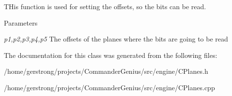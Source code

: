 THis function is used for setting the offsets, so the bits can be read. 


\begin{DoxyParams}{Parameters}
\item[{\em p1,p2,p3,p4,p5}]The offsets of the planes where the bits are going to be read \end{DoxyParams}


The documentation for this class was generated from the following files:\begin{DoxyCompactItemize}
\item 
/home/gerstrong/projects/CommanderGenius/src/engine/CPlanes.h\item 
/home/gerstrong/projects/CommanderGenius/src/engine/CPlanes.cpp\end{DoxyCompactItemize}
